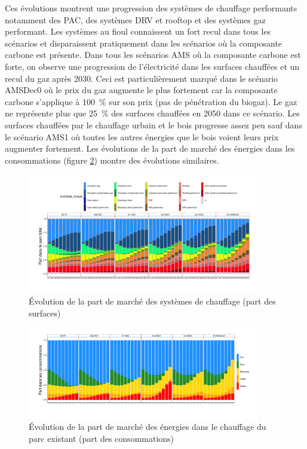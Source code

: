 \documentclass[10.5pt,a4paper]{article}
\begin{document}
{Ces évolutions montrent une progression des systèmes de chauffage performants notamment des PAC, des systèmes DRV et rooftop et des systèmes gaz performant. Les systèmes au fioul connaissent un fort recul dans tous les scénarios et disparaissent pratiquement dans les scénarios où la composante carbone est présente. Dans tous les scénarios AMS où la composante carbone est forte, on observe une progression de l’électricité dans les surfaces chauffées et un recul du gaz après 2030. Ceci est particulièrement marqué dans le scénario AMSDec0 où le prix du gaz augmente le plus fortement car la composante carbone s'applique à 100~\% sur son prix (pas de pénétration du biogaz). Le gaz ne représente plus que 25~\% des surfaces chauffées en 2050 dans ce scénario. Les surfaces chauffées par le chauffage urbain et le bois progresse assez peu sauf dans le scénario AMS1 où toutes les autres énergies que le bois voient leurs prix augmenter fortement. Les évolutions de la part de marché des énergies dans les consommations (figure \ref{Evol_PM_ener_cahuffage_exi-1}) montre des évolutions similaires.

\begin{figure}[h!]
\centering 
\caption{Évolution de la part de marché des systèmes de chauffage (part des surfaces)}\label{Evol_PM_syst_all-1}  
\includegraphics[width = 0.9\textwidth]{Evol_PM_syst_all-1}  
\end{figure}

\begin{figure}[h!]
\centering 
\caption{Évolution de la part de marché des énergies dans le chauffage du parc existant (part des consommations)}\label{Evol_PM_ener_cahuffage_exi-1}  
\includegraphics[width = 0.9\textwidth]{Evol_PM_ener_cahuffage_exi-1}  
\end{figure}


}
\end{document}
